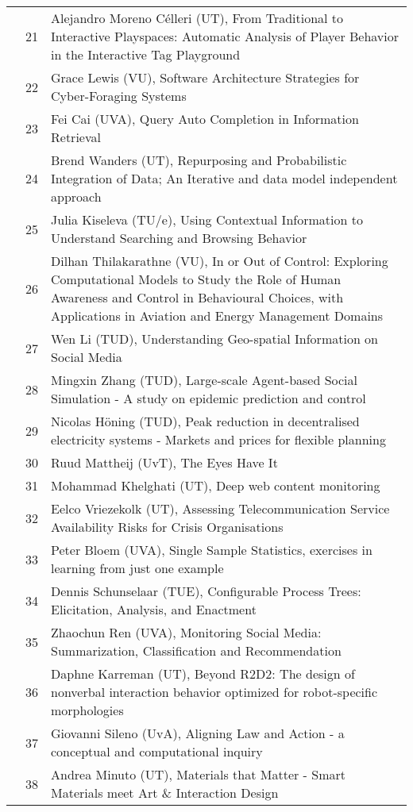 \begin{longtabu}{@{}l@{ }l@{\hspace{1em}}X}
	&	 21	&	 Alejandro Moreno C\'{e}lleri (UT), From Traditional to Interactive Playspaces: Automatic Analysis of Player Behavior in the Interactive Tag Playground\\
	&	 22	&	 Grace Lewis (VU), Software Architecture Strategies for Cyber-Foraging Systems\\
	&	 23	&	 Fei Cai (UVA), Query Auto Completion in Information Retrieval\\
	&	 24	&	 Brend Wanders (UT), Repurposing and Probabilistic Integration of Data; An Iterative and data model independent approach\\
	&	 25	&	 Julia Kiseleva (TU/e), Using Contextual Information to Understand Searching and Browsing Behavior\\
	&	 26	&	 Dilhan Thilakarathne (VU), In or Out of Control: Exploring Computational Models to Study the Role of Human Awareness and Control in Behavioural Choices, with Applications in Aviation and Energy Management Domains\\
	&	 27	&	 Wen Li (TUD), Understanding Geo-spatial Information on Social Media\\
	&	 28	&	 Mingxin Zhang (TUD), Large-scale Agent-based Social Simulation - A study on epidemic prediction and control\\
	&	 29	&	 Nicolas H\"{o}ning (TUD), Peak reduction in decentralised electricity systems - Markets and prices for flexible planning\\
	&	 30	&	 Ruud Mattheij (UvT), The Eyes Have It\\
	&	 31	&	 Mohammad Khelghati (UT), Deep web content monitoring\\
	&	 32	&	 Eelco Vriezekolk (UT), Assessing Telecommunication Service Availability Risks for Crisis Organisations\\
	&	 33	&	 Peter Bloem (UVA), Single Sample Statistics, exercises in learning from just one example\\
	&	 34	&	 Dennis Schunselaar (TUE), Configurable Process Trees: Elicitation, Analysis, and Enactment\\
	&	 35	&	 Zhaochun Ren (UVA), Monitoring Social Media: Summarization, Classification and Recommendation\\
	&	 36	&	 Daphne Karreman (UT), Beyond R2D2: The design of nonverbal interaction behavior optimized for robot-specific morphologies\\
	&	 37	&	 Giovanni Sileno (UvA), Aligning Law and Action - a conceptual and computational inquiry\\
	&	 38	&	 Andrea Minuto (UT), Materials that Matter - Smart Materials meet Art \& Interaction Design\\

\end{longtabu}
